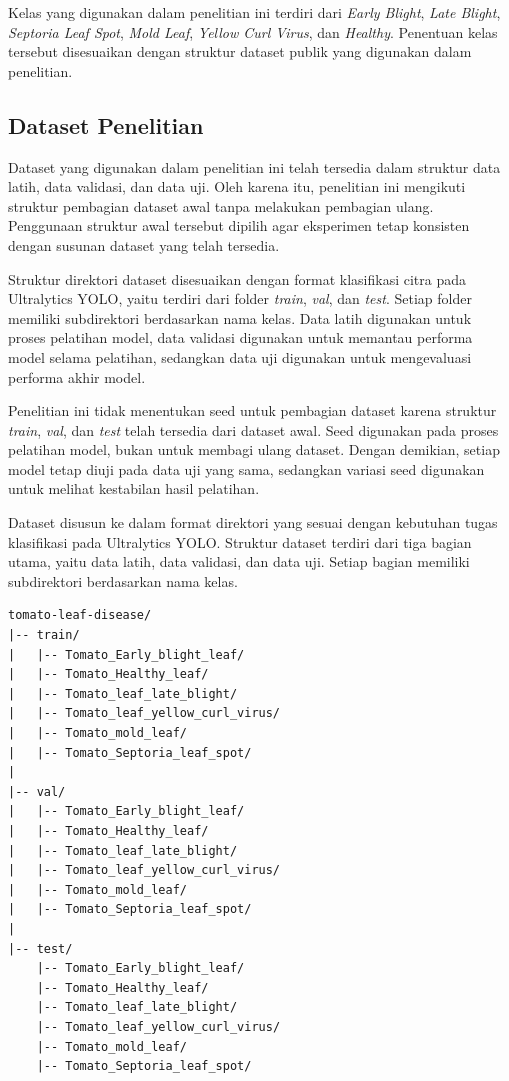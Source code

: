 \begin{sectioncontent}
\begin{subsectioncontent}
    Kelas yang digunakan dalam penelitian ini terdiri dari \textit{Early Blight}, \textit{Late Blight}, \textit{Septoria Leaf Spot}, \textit{Mold Leaf}, \textit{Yellow Curl Virus}, dan \textit{Healthy}. Penentuan kelas tersebut disesuaikan dengan struktur dataset publik yang digunakan dalam penelitian.
\end{subsectioncontent}

\subsection{Dataset Penelitian}
\begin{subsectioncontent}
    \hspace{\parindent}Dataset yang digunakan dalam penelitian ini telah tersedia dalam struktur data latih, data validasi, dan data uji. Oleh karena itu, penelitian ini mengikuti struktur pembagian dataset awal tanpa melakukan pembagian ulang. Penggunaan struktur awal tersebut dipilih agar eksperimen tetap konsisten dengan susunan dataset yang telah tersedia.

    Struktur direktori dataset disesuaikan dengan format klasifikasi citra pada Ultralytics YOLO, yaitu terdiri dari folder \textit{train}, \textit{val}, dan \textit{test}. Setiap folder memiliki subdirektori berdasarkan nama kelas. Data latih digunakan untuk proses pelatihan model, data validasi digunakan untuk memantau performa model selama pelatihan, sedangkan data uji digunakan untuk mengevaluasi performa akhir model.

    Penelitian ini tidak menentukan seed untuk pembagian dataset karena struktur \textit{train}, \textit{val}, dan \textit{test} telah tersedia dari dataset awal. Seed digunakan pada proses pelatihan model, bukan untuk membagi ulang dataset. Dengan demikian, setiap model tetap diuji pada data uji yang sama, sedangkan variasi seed digunakan untuk melihat kestabilan hasil pelatihan.

    Dataset disusun ke dalam format direktori yang sesuai dengan kebutuhan tugas klasifikasi pada Ultralytics YOLO. Struktur dataset terdiri dari tiga bagian utama, yaitu data latih, data validasi, dan data uji. Setiap bagian memiliki subdirektori berdasarkan nama kelas.

    \begin{verbatim}
tomato-leaf-disease/
|-- train/
|   |-- Tomato_Early_blight_leaf/
|   |-- Tomato_Healthy_leaf/
|   |-- Tomato_leaf_late_blight/
|   |-- Tomato_leaf_yellow_curl_virus/
|   |-- Tomato_mold_leaf/
|   |-- Tomato_Septoria_leaf_spot/
|
|-- val/
|   |-- Tomato_Early_blight_leaf/
|   |-- Tomato_Healthy_leaf/
|   |-- Tomato_leaf_late_blight/
|   |-- Tomato_leaf_yellow_curl_virus/
|   |-- Tomato_mold_leaf/
|   |-- Tomato_Septoria_leaf_spot/
|
|-- test/
    |-- Tomato_Early_blight_leaf/
    |-- Tomato_Healthy_leaf/
    |-- Tomato_leaf_late_blight/
    |-- Tomato_leaf_yellow_curl_virus/
    |-- Tomato_mold_leaf/
    |-- Tomato_Septoria_leaf_spot/
    \end{verbatim}



\end{subsectioncontent}
\end{sectioncontent}
